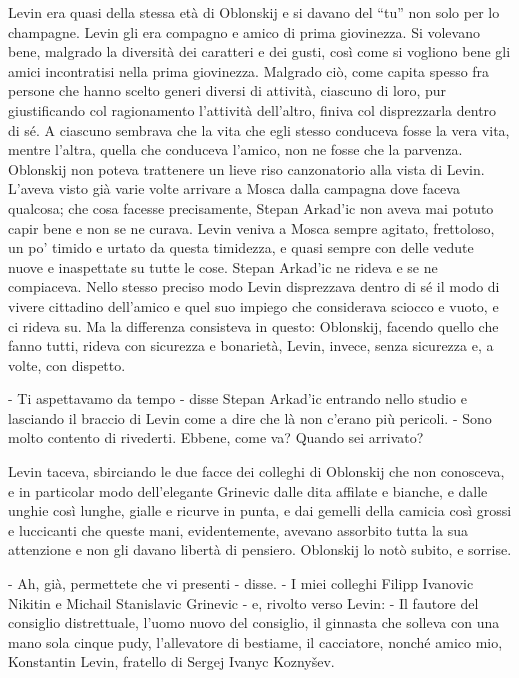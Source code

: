 Levin era quasi della stessa età di Oblonskij e si davano del ``tu'' non solo per lo champagne. Levin gli era compagno e amico di prima giovinezza. Si volevano bene, malgrado la diversità dei caratteri e dei gusti, così come si vogliono bene gli amici incontratisi nella prima giovinezza. Malgrado ciò, come capita spesso fra persone che hanno scelto generi diversi di attività, ciascuno di loro, pur giustificando col ragionamento l'attività dell'altro, finiva col disprezzarla dentro di sé. A ciascuno sembrava che la vita che egli stesso conduceva fosse la vera vita, mentre l'altra, quella che conduceva l'amico, non ne fosse che la parvenza. Oblonskij non poteva trattenere un lieve riso canzonatorio alla vista di Levin. L'aveva visto già varie volte arrivare a Mosca dalla campagna dove faceva qualcosa; che cosa facesse precisamente, Stepan Arkad'ic non aveva mai potuto capir bene e non se ne curava. Levin veniva a Mosca sempre agitato, frettoloso, un po' timido e urtato da questa timidezza, e quasi sempre con delle vedute nuove e inaspettate su tutte le cose. Stepan Arkad'ic ne rideva e se ne compiaceva. Nello stesso preciso modo Levin disprezzava dentro di sé il modo di vivere cittadino dell'amico e quel suo impiego che considerava sciocco e vuoto, e ci rideva su. Ma la differenza consisteva in questo: Oblonskij, facendo quello che fanno tutti, rideva con sicurezza e bonarietà, Levin, invece, senza sicurezza e, a volte, con dispetto. 

- Ti aspettavamo da tempo - disse Stepan Arkad'ic entrando nello studio e lasciando il braccio di Levin come a dire che là non c'erano più pericoli. - Sono molto contento di rivederti. Ebbene, come va? Quando sei arrivato? 

Levin taceva, sbirciando le due facce dei colleghi di Oblonskij che non conosceva, e in particolar modo dell'elegante Grinevic dalle dita affilate e bianche, e dalle unghie così lunghe, gialle e ricurve in punta, e dai gemelli della camicia così grossi e luccicanti che queste mani, evidentemente, avevano assorbito tutta la sua attenzione e non gli davano libertà di pensiero. Oblonskij lo notò subito, e sorrise. 

- Ah, già, permettete che vi presenti - disse. - I miei colleghi Filipp Ivanovic Nikitin e Michail Stanislavic Grinevic - e, rivolto verso Levin: - Il fautore del consiglio distrettuale, l'uomo nuovo del consiglio, il ginnasta che solleva con una mano sola cinque pudy, l'allevatore di bestiame, il cacciatore, nonché amico mio, Konstantin Levin, fratello di Sergej Ivanyc Koznyšev. 

